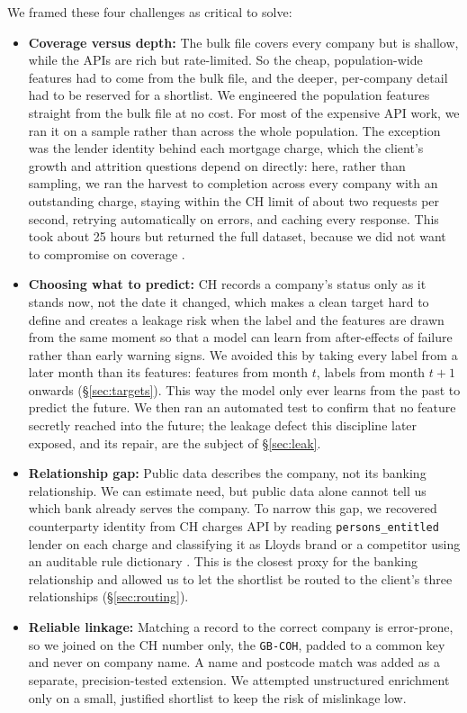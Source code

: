 \documentclass[    author={Samuel Menon Demelo; Sneha Saphala Ram Prasad; 
Viktor Ander Lindholm; Vishal Khatri},
               supervisor={Prof. Fernando Moreno-Pino},
                   degree={MSc},
                    title={Lloyds Commercial Banking Intelligence},
                 subtitle={Ranking SME Lending, Risk and Growth Prospects for Lloyds Banking Group},
                     type={},
                     year={2026}]{dissertation}
\begin{document}
We framed these four challenges as critical to solve:
\begin{itemize}
    \item \textbf{Coverage versus depth:} The bulk file covers every company but is shallow, while the APIs are rich but rate-limited. So the cheap, population-wide features had to come from the bulk file, and the deeper, per-company detail had to be reserved for a shortlist. We engineered the population features straight from the bulk file at no cost. For most of the expensive API work, we ran it on a sample rather than across the whole population. The exception was the lender identity behind each mortgage charge, which the client's growth and attrition questions depend on directly: here, rather than sampling, we ran the harvest to completion across every company with an outstanding charge, staying within the CH limit of about two requests per second, retrying automatically on errors, and caching every response. This took about 25 hours but returned the full dataset, because we did not want to compromise on coverage \cite{companieshouse_api}.
    \item \textbf{Choosing what to predict:} CH records a company's status only as it stands now, not the date it changed, which makes a clean target hard to define and creates a leakage risk when the label and the features are drawn from the same moment so that a model can learn from after-effects of failure rather than early warning signs. We avoided this by taking every label from a later month than its features: features from month $t$, labels from month $t{+}1$ onwards (\S\ref{sec:targets}). This way the model only ever learns from the past to predict the future. We then ran an automated test to confirm that no feature secretly reached into the future; the leakage defect this discipline later exposed, and its repair, are the subject of \S\ref{sec:leak}.
    \item \textbf{Relationship gap:} Public data describes the company, not its banking relationship. We can estimate need, but public data alone cannot tell us which bank already serves the company. To narrow this gap, we recovered counterparty identity from CH charges API by reading \texttt{persons\_entitled} lender on each charge and classifying it as Lloyds brand or a competitor using an auditable rule dictionary \cite{companieshouse_api}. This is the closest proxy for the banking relationship and allowed us to let the shortlist be routed to the client's three relationships (\S\ref{sec:routing}).
    \item \textbf{Reliable linkage:} Matching a record to the correct company is error-prone, so we joined on the CH number only, the \texttt{GB-COH}, padded to a common key and never on company name. A name and postcode match was added as a separate, precision-tested extension. We attempted unstructured enrichment only on a small, justified shortlist to keep the risk of mislinkage low.

\end{itemize}
\end{document}
